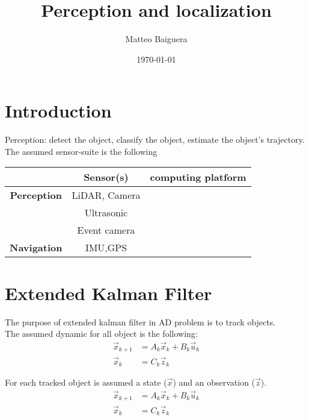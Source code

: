 \documentclass[•]{article}
\begin{document}
\title{Perception and localization}
\author{Matteo Baiguera}
\maketitle


\date{\today}

\section{Introduction}
Perception: detect the object, classify the object, estimate the object's trajectory.\\
The assumed sensor-suite is the following 
\begin{center}
\begin{tabular}{c|c|c|}
\hline
				   & Sensor(s)& computing platform\\
\hline
\textbf{Perception}& LiDAR, Camera&\\
\hline
					& Ultrasonic&\\
\hline
					& Event camera&\\
\hline
\hline
\textbf{Navigation}& IMU,GPS&\\
\hline
\end{tabular}
\end{center}



\section{Extended Kalman Filter}

The purpose of extended kalman filter in AD problem is to track objects.\\

The assumed dynamic for all object is the following:
\begin{align*}
\vec{x}_{k+1} &= A_k \vec{x}_k + B_k \vec{u}_k  \\
\vec{x}_{k} &= C_k \vec{z}_k
\end{align*} 

For each tracked object is assumed a state ($\vec{x} $) and an observation ($\vec{z} $).\\
\begin{align*}
\vec{x}_{k+1} &= A_k \vec{x}_k + B_k \vec{u}_k  \\
\vec{x}_{k} &= C_k \vec{z}_k
\end{align*} 
\end{document}
